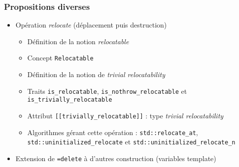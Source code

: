 \documentclass[C++.tex]{subfiles}
\begin{document}
\begin{frame}[fragile]
	\frametitle{Propositions diverses}
	\begin{itemize}
		\item Opération \og \textit{relocate}\fg{} (déplacement puis destruction)


		\begin{itemize}
			\item Définition de la notion \og \textit{relocatable}\fg{} 
			\item Concept \lstinline|Relocatable|


			\item Définition de la notion de \og \textit{trivial relocatability}\fg{}


			\item Traits \lstinline|is_relocatable|, \lstinline|is_nothrow_relocatable| et \lstinline|is_trivially_relocatable|
			\item Attribut \lstinline|[[trivially_relocatable]]| : type \textit{trivial relocatability}
			\item Algorithmes gérant cette opération : \lstinline|std::relocate_at|, \lstinline|std::uninitialized_relocate| et \lstinline|std::uninitialized_relocate_n|
		\end{itemize}

		\item Extension de \lstinline|=delete| à d'autres construction (variables template)

	\end{itemize}
\end{frame}
\end{document}

